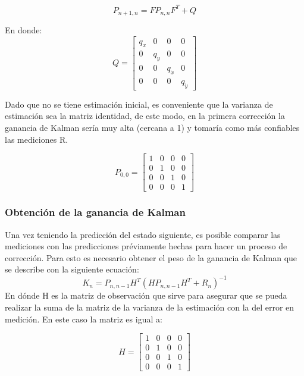 \begin{equation}
P_{n+1,n} = F P_{n,n} F^{T} + Q
\label{eq:extrapolation_covariance}
\end{equation}

En donde:
\begin{equation}
Q =
\begin{bmatrix}
q_x & 0 & 0 & 0\\ 
0 & q_y & 0 & 0\\ 
0 & 0 & q_{\dot{x}} & 0\\ 
0 & 0 & 0 & q_{\dot{y}}
\end{bmatrix}
\end{equation}	

Dado que no se tiene estimación inicial, es conveniente que la varianza de estimación sea la matriz identidad, de este modo, en la primera corrección la ganancia de Kalman sería muy alta (cercana a 1) y tomaría como más confiables las mediciones R.

\begin{equation}
P_{0,0} =
\begin{bmatrix}
1 & 0 & 0 & 0\\ 
0 & 1 & 0 & 0\\ 
0 & 0 & 1 & 0\\ 
0 & 0 & 0 & 1
\end{bmatrix}
\end{equation}	

		\subsubsection*{Obtención de la ganancia de Kalman}
	Una vez teniendo la predicción del estado siguiente, es posible comparar las mediciones con las predicciones préviamente hechas para hacer un proceso de corrección. Para esto es necesario obtener el peso de la ganancia de Kalman que se describe con la siguiente ecuación:
\begin{equation}
K_n = P_{n,n-1} H^T (H P_{n,n-1}H^T + R_n)^{-1}	
\end{equation}
	En dónde H es la matriz de observación que sirve para asegurar que se pueda realizar la suma de la matriz de la varianza de la estimación con la del error en medición. En este caso la matriz es igual a:
	
\begin{equation}
H = 
\begin{bmatrix}
1 & 0 & 0 & 0\\ 
0 & 1 & 0 & 0\\ 
0 & 0 & 1 & 0\\ 
0 & 0 & 0 & 1
\end{bmatrix}
\end{equation}
	
